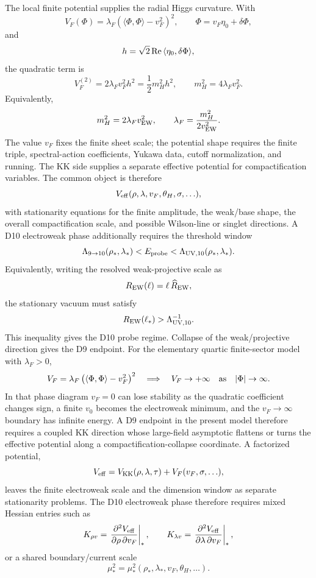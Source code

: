 \documentclass[11pt]{article}
\theoremstyle{definition}
\theoremstyle{remark}
\begin{document}
The local finite potential supplies the radial Higgs curvature.  With
\[
  V_F(\Phi)=\lambda_F
  \left(\langle\Phi,\Phi\rangle-v_F^2\right)^2,
  \qquad
  \Phi=v_F\eta_0+\delta\Phi,
\]
and
\[
  h=\sqrt2\,{\rm Re}\,\langle\eta_0,\delta\Phi\rangle,
\]
the quadratic term is
\[
  V_F^{(2)}
  =
  2\lambda_Fv_F^2h^2
  =
  \frac12 m_H^2h^2,
  \qquad
  m_H^2=4\lambda_Fv_F^2.
\]
Equivalently,
\[
  m_H^2=2\lambda_Fv_{\rm EW}^2,
  \qquad
  \lambda_F=\frac{m_H^2}{2v_{\rm EW}^2}.
\]
The value \(v_F\) fixes the finite sheet scale; the potential shape requires
the finite triple, spectral-action coefficients, Yukawa data, cutoff
normalization, and running.  The KK side supplies a separate effective
potential for compactification variables.  The common object is therefore
\[
  V_{\rm eff}(\rho,\lambda,v_F,\theta_H,\sigma,\ldots),
\]
with stationarity equations for the finite amplitude, the weak/base shape,
the overall compactification scale, and possible Wilson-line or singlet
directions.  A D10 electroweak phase additionally requires the threshold
window
\[
  \Lambda_{9\to10}(\rho_*,\lambda_*)
  <
  E_{\rm probe}
  <
  \Lambda_{{\rm UV},10}(\rho_*,\lambda_*) .
\]
Equivalently, writing the resolved weak-projective scale as
\[
  R_{\rm EW}(\ell)=\ell\,\widehat R_{\rm EW},
\]
the stationary vacuum must satisfy
\[
  R_{\rm EW}(\ell_*)>\Lambda_{{\rm UV},10}^{-1}.
\]
This inequality gives the D10 probe regime.  Collapse of the weak/projective
direction gives the D9 endpoint.
For the elementary quartic finite-sector model with \(\lambda_F>0\),
\[
  V_F=\lambda_F\left(\langle\Phi,\Phi\rangle-v_F^2\right)^2
  \quad\Longrightarrow\quad
  V_F\to+\infty\quad {\rm as}\quad |\Phi|\to\infty .
\]
In that phase diagram \(v_F=0\) can lose stability as the quadratic
coefficient changes sign, a finite \(v_0\) becomes the electroweak minimum,
and the \(v_F\to\infty\) boundary has infinite energy.  A D9 endpoint in the
present model therefore requires a coupled KK direction whose large-field
asymptotic flattens or turns the effective potential along a
compactification-collapse coordinate.
A factorized potential,
\[
  V_{\rm eff}=V_{\rm KK}(\rho,\lambda,\tau)+V_F(v_F,\sigma,\ldots),
\]
leaves the finite electroweak scale and the dimension window as separate
stationarity problems.  The D10 electroweak phase therefore requires mixed
Hessian entries such as
\[
  K_{\rho v}
  =
  \left.\frac{\partial^2V_{\rm eff}}{\partial\rho\,\partial v_F}\right|_*,
  \qquad
  K_{\lambda v}
  =
  \left.\frac{\partial^2V_{\rm eff}}{\partial\lambda\,\partial v_F}\right|_*,
\]
or a shared boundary/current scale
\[
  \mu_*^2=\mu_*^2(\rho_*,\lambda_*,v_F,\theta_H,\ldots).
\]
\end{document}
